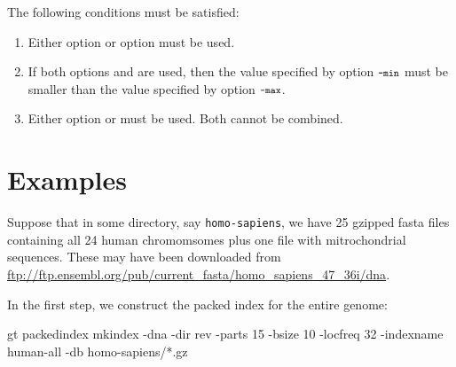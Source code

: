 \documentclass[12pt]{article}
\begin{document}
\begin{Justshowoptions}


\Helpoption

\end{Justshowoptions}
The following conditions must be satisfied:
\begin{enumerate}
\item
Either option   or option  must be used.
\item
If both options  and  are used, then
the value specified by option \(\mbox{\footnotesize \texttt{-min}}\) must be smaller
than the value specified by option \(\mbox{\footnotesize \texttt{-max}}\).
\item
Either option  or  must be used. Both cannot
be combined.
\end{enumerate}

\section{Examples}

Suppose that in some directory, say \texttt{homo-sapiens}, we have 25 gzipped
fasta files containing all 24 human chromomsomes plus one file with 
mitrochondrial sequences. These may have been downloaded from
\url{ftp://ftp.ensembl.org/pub/current_fasta/homo_sapiens_47_36i/dna}.

In the first step, we construct the packed index for the entire genome:

\begin{Output}
gt packedindex mkindex -dna -dir rev -parts 15 -bsize 10 -locfreq 32
                       -indexname human-all -db homo-sapiens/*.gz
\end{Output}
\end{document}
